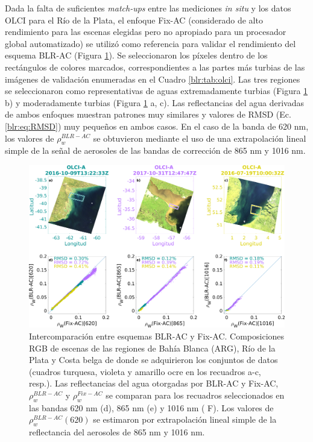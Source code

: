             Dada la falta de suficientes \textit{match-ups} entre las mediciones \textit{in situ} y los datos OLCI para el Río de la Plata, el enfoque Fix-AC (considerado de alto rendimiento para las escenas elegidas pero no apropiado para un procesador global automatizado) se utilizó como referencia para validar el rendimiento del esquema BLR-AC (Figura \ref{blr:ACInterFixAC}). Se seleccionaron los píxeles dentro de los rectángulos de colores marcados, correspondientes a las partes más turbias de las imágenes de validación enumeradas en el Cuadro \ref{blr:tab:olci}. Las tres regiones se seleccionaron como representativas de aguas extremadamente turbias (Figura \ref{blr:ACInterFixAC} b) y moderadamente turbias (Figura \ref{blr:ACInterFixAC} a, c). Las reflectancias del agua derivadas de ambos enfoques muestran patrones muy similares y valores de RMSD (Ec. \ref{blr:eq:RMSD}) muy pequeños en ambos casos.
            En el caso de la banda de 620 nm, los valores de $\rho_{w}^{BLR-AC}$ se obtuvieron mediante el uso de una extrapolación lineal simple de la señal de aerosoles de las bandas de corrección de 865 nm y 1016 nm.

            \begin{figure}
            \centering
            \includegraphics[width=\textwidth]{blr/figures/ValFixAcVsBlrAc}
            \caption[Intercomparación entre esquemas BLR-AC y Fix-AC.]{Intercomparación entre esquemas BLR-AC y Fix-AC. Composiciones RGB de escenas de las regiones de Bahía Blanca (ARG), Río de la Plata y Costa belga de donde se adquirieron los conjuntos de datos (cuadros turquesa, violeta y amarillo ocre en los recuadros a-c, resp.). Las reflectancias del agua otorgadas por BLR-AC y Fix-AC, $\rho_{w}^{BLR-AC}$ y $\rho_{w}^{Fix-AC}$ se comparan para los recuadros seleccionados en las bandas 620 nm (d), 865 nm (e) y 1016 nm ( F). Los valores de $\rho_{w}^{BLR-AC}(620)$ se estimaron por extrapolación lineal simple de la reflectancia del aerosoles de 865 nm y 1016 nm.}
            \label{blr:ACInterFixAC}
            \end{figure}

